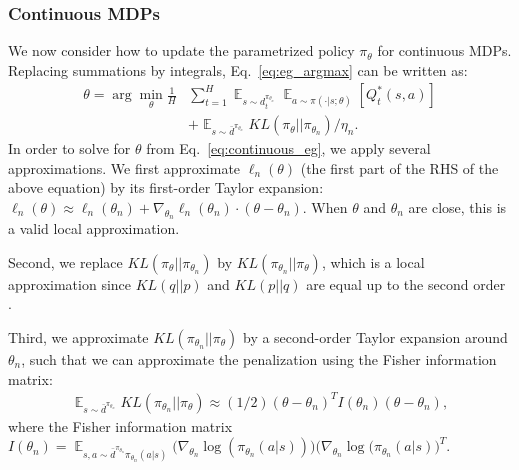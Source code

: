 \documentclass{article}
\begin{document}

\subsubsection{Continuous MDPs}
We now consider how to update the parametrized policy $\pi_{\theta}$ for continuous MDPs. Replacing summations by integrals, Eq.~\ref{eq:eg_argmax} can be written as:
\begin{align}
\label{eq:continuous_eg}
\theta = \arg\min_{\theta}\frac{1}{H}& \sum_{t=1}^H  \mathop{\mathbb{E}}_{s\sim d_t^{\pi_{\theta_n}}}\mathop{\mathbb{E}}_{a\sim\pi(\cdot|s;\theta)}[Q_t^*(s,a)] \nonumber\\
& + \mathop{\mathbb{E}}_{s\sim\bar{d}^{\pi_{\theta_n}}}KL(\pi_{\theta} ||\pi_{\theta_n})/\eta_{n}.
\end{align} 
In order to solve for $\theta$ from Eq.~\ref{eq:continuous_eg}, we apply several approximations. We first approximate $\ell_n(\theta)$ (the first part of the RHS of the above equation) by its first-order Taylor expansion: $\ell_n(\theta)\approx \ell_n(\theta_n) + \nabla_{\theta_n}\ell_n(\theta_n) \cdot (\theta - \theta_n)$. When $\theta$ and $\theta_n$ are close, this is a valid local approximation. 

Second, we replace $KL(\pi_{\theta}||\pi_{\theta_n})$ by $KL(\pi_{\theta_n}||\pi_{\theta})$, which is a local approximation since $KL(q||p)$ and $KL(p||q)$ are equal up to the second order \cite{kakade2002approximately,schulman2015trust}.

Third, we approximate $KL(\pi_{\theta_n}||\pi_{\theta})$ by a second-order Taylor expansion around $\theta_n$, such that we can approximate the penalization using the Fisher information matrix:
\begin{align}
\mathop{\mathbb{E}}_{s\sim\bar{d}^{\pi_{\theta_n}}}KL(\pi_{\theta_n} || \pi_{\theta}) \approx (1/2)(\theta - \theta_n)^T I(\theta_n)(\theta-\theta_n), \nonumber
\end{align} where the Fisher information matrix $I(\theta_n)=\mathop{\mathbb{E}}_{s,a\sim \bar{d}^{\pi_{\theta_n}}\pi_{\theta_n}(a|s)}\big(\nabla_{\theta_n}\log(\pi_{\theta_n}(a|s))\big)\big(\nabla_{\theta_n}\log(\pi_{\theta_n}(a|s)\big)^T$. 
\end{document}
